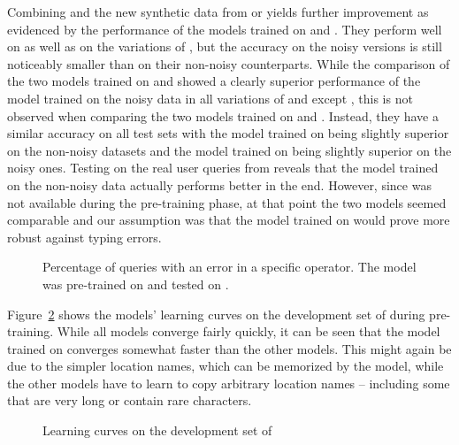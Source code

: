 Combining \nlmtwoone{} and the new synthetic data from \nlmthreea{} or
\nlmthreeb{} yields further improvement as evidenced by the performance of the
models trained on \nlmthreenormal{} and \nlmthree{}. They perform well on
\nlmtwoone{} as well as on the variations of \nlmthree{}, but the accuracy on
the noisy versions is still noticeably smaller than on their non-noisy
counterparts. While the comparison of the two models trained on \nlmthreea{} and
\nlmthreeb{} showed a clearly superior performance of the model trained on the
noisy data in all variations of \nlmtwo{} and \nlmthree{} except \nlmthreea{},
this is not observed when comparing the two models trained on \nlmthreenormal{}
and \nlmthree{}. Instead, they have a similar accuracy on all test sets with the
model trained on \nlmthreenormal{} being slightly superior on the non-noisy
datasets and the model trained on \nlmthree{} being slightly superior on the
noisy ones. Testing on the real user queries from \nlmfour{} reveals that the
model trained on the non-noisy data actually performs better in the end.
However, since \nlmfour{} was not available during the pre-training phase, at
that point the two models seemed comparable and our assumption was that the
model trained on \nlmthreeb{} would prove more robust against typing errors.

\begin{figure}[h]
  \centering
  \resizebox{\textwidth}{!}{}
  \caption[Errors pre-trained on \nlmtwoone{}]{Percentage of queries with an
    error in a specific operator. The model was pre-trained on \nlmapsthree{}
    and tested on \nlmapsfour{}.}
  \label{fig:v3-errors}
\end{figure}

Figure~\ref{fig:pre-trained-learning-curve} shows the models’ learning curves on
the development set of \nlmthree{} during pre-training. While all models
converge fairly quickly, it can be seen that the model trained on \nlmtwoone{}
converges somewhat faster than the other models. This might again be due to the
simpler location names, which can be memorized by the model, while the other
models have to learn to copy arbitrary location names – including some that are
very long or contain rare characters.

\begin{figure}[h]
  \centering
  \resizebox{\textwidth}{!}{}
  \caption[Pre-training learning curves]{Learning curves on the development set
    of \nlmapsthree{}}
  \label{fig:pre-trained-learning-curve}
\end{figure}

